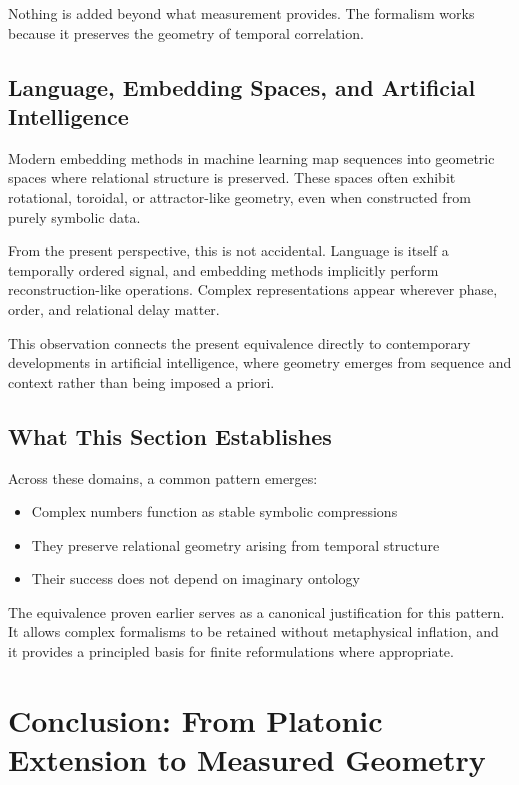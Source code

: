 \documentclass[12pt]{book}  %
\begin{document}
Nothing is added beyond what measurement provides. The formalism works because it preserves the geometry of temporal correlation.

\section*{Language, Embedding Spaces, and Artificial Intelligence}

Modern embedding methods in machine learning map sequences into geometric spaces where relational structure is preserved. These spaces often exhibit rotational, toroidal, or attractor-like geometry, even when constructed from purely symbolic data.

From the present perspective, this is not accidental. Language is itself a temporally ordered signal, and embedding methods implicitly perform reconstruction-like operations. Complex representations appear wherever phase, order, and relational delay matter.

This observation connects the present equivalence directly to contemporary developments in artificial intelligence, where geometry emerges from sequence and context rather than being imposed a priori.

\section*{What This Section Establishes}

Across these domains, a common pattern emerges:

\begin{itemize}
    \item Complex numbers function as stable symbolic compressions
    \item They preserve relational geometry arising from temporal structure
    \item Their success does not depend on imaginary ontology
\end{itemize}

The equivalence proven earlier serves as a canonical justification for this pattern. It allows complex formalisms to be retained without metaphysical inflation, and it provides a principled basis for finite reformulations where appropriate.

\chapter{Conclusion: From Platonic Extension to Measured Geometry}
\end{document}
